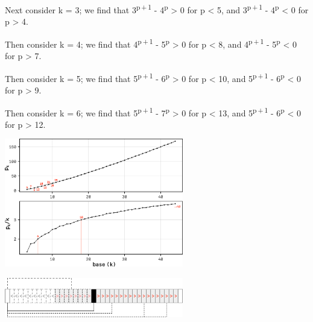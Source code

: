 \documentclass[a4paper,10pt]{article}
\begin{document}
\begin{flushleft}
{{	Next consider k = 3; we find that 3\textsuperscript{p\,+\,1} - 4\textsuperscript{p} > 0 for p < 5, and 3\textsuperscript{p\,+\,1} - 4\textsuperscript{p} < 0 for p > 4.\vspace{2mm}
	
	Then consider k = 4; we find that 4\textsuperscript{p\,+\,1} - 5\textsuperscript{p} > 0 for p < 8, and 4\textsuperscript{p\,+\,1} - 5\textsuperscript{p} < 0 for p > 7.\vspace{2mm}

	Then consider k = 5; we find that 5\textsuperscript{p\,+\,1} - 6\textsuperscript{p} > 0 for p < 10, and 5\textsuperscript{p\,+\,1} - 6\textsuperscript{p} < 0 for p > 9.\vspace{2mm}
	
	Then consider k = 6; we find that 5\textsuperscript{p\,+\,1} - 7\textsuperscript{p} > 0 for p < 13, and 5\textsuperscript{p\,+\,1} - 6\textsuperscript{p} < 0 for p > 12.\linebreak 
	}}
\end{flushleft}
\pagebreak
\begin{multicols}{2}
	\noindent
	\begin{minipage}{\linewidth}
		\centering
		\includegraphics[width=78mm]{./img/Crosses.png}\vspace{1mm}
		\label{fig:crosses}
	\end{minipage}
	\noindent
	\begin{minipage}{\linewidth}
		\centering
		\includegraphics[width=78mm]{./img/Exponents.png}
		\label{fig:exponents}
	\end{minipage}
	\linebreak
	\vspace{4mm}
	\linebreak
	\vspace{2mm}
\end{multicols}
\end{document}
